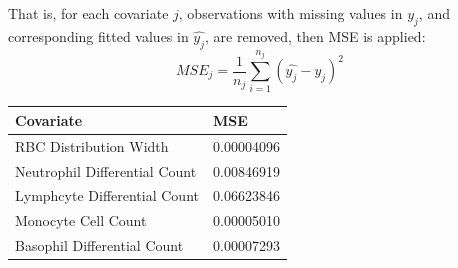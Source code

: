 \documentclass[landscape,a0paper,fontscale=0.285]{baposter} %
\begin{document}
\begin{poster}
{That is, for each covariate $j$, observations with missing values in $y_{j}$,
and corresponding fitted values in $\hat{y_{j}}$, are removed, then MSE is
applied:
$$ MSE_{j} = \frac{1}{n_{j}} \sum_{i = 1}^{n_{j}} (\hat{y_{j}} - y_{j})^{2} $$

\begin{center}
\begin{tabular}{l l}
\toprule
\textbf{Covariate} & \textbf{MSE}\\
\midrule
RBC Distribution Width & 0.00004096 \\
Neutrophil Differential Count & 0.00846919 \\
Lymphcyte Differential Count & 0.06623846 \\
Monocyte Cell Count & 0.00005010 \\
Basophil Differential Count & 0.00007293 \\
\bottomrule
\end{tabular}
\end{center}
}


\end{poster}
\end{document}
